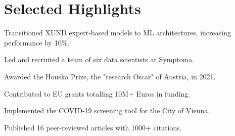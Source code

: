 \section{Selected Highlights}
\begin{itemize*}
 \item Transitioned XUND expert-based models to ML architectures, increasing performance by 10\%.
 \item Led and recruited a team of six data scientists at Symptoma.
 \item Awarded the Houska Prize, the "research Oscar" of Austria, in 2021.
 \item Contributed to EU grants totalling 10M+ Euros in funding.
 \item Implemented the COVID-19 screening tool for the City of Vienna.
 \item Published 16 peer-reviewed articles with 1000+ citations.
\end{itemize*}
